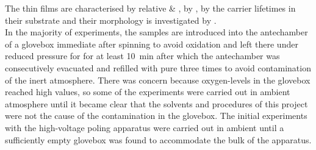 The \pvdf{} thin films are characterised by relative \cpd{} \& \spv{}, by \ftir{}, by the  carrier lifetimes in their substrate and their morphology is investigated by \sem{}.\\
In the majority of experiments, the samples are introduced into the antechamber of a glovebox immediate after spinning to avoid oxidation and left there under reduced pressure for for at least \SI{10}{\minute} after which the antechamber was consecutively evacuated and refilled with pure \nitro{} three times to avoid contamination of the inert atmosphere. There was concern because oxygen-levels in the glovebox reached high values, so some of the experiments were carried out in ambient atmosphere until it became clear that the solvents and procedures of this project were not the cause of the contamination in the glovebox. The initial experiments with the high-voltage poling apparatus were carried out in ambient until a sufficiently empty glovebox was found to accommodate the bulk of the apparatus.\\
